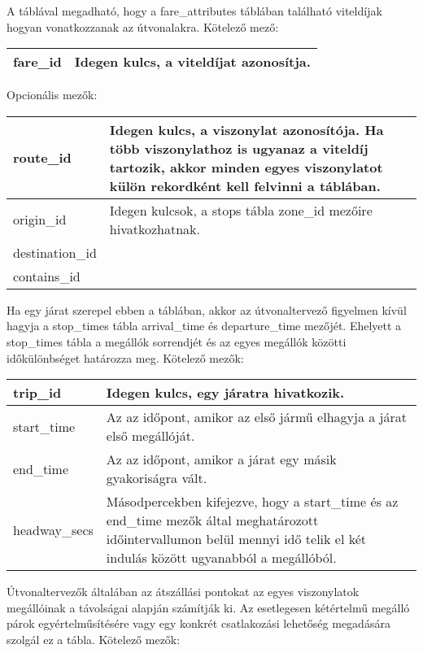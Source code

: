 
A táblával megadható, hogy a fare\_attributes táblában található viteldíjak hogyan vonatkozzanak az útvonalakra.
Kötelező mező:

\begin{tabular}{|p{3cm}|p{10cm}|}
\hline
fare\_id & Idegen kulcs, a viteldíjat azonosítja. \\
\hline
\end{tabular}

Opcionális mezők:


\begin{tabular}{|p{3cm}|p{10cm}|}
\hline
route\_id & Idegen kulcs, a viszonylat azonosítója. Ha több viszonylathoz is ugyanaz a viteldíj tartozik, akkor minden egyes viszonylatot külön rekordként kell felvinni a táblában. \\
\hline
origin\_id & Idegen kulcsok, a stops tábla zone\_id mezőire hivatkozhatnak. \\
\hline
destination\_id &  \\
\hline
contains\_id & \\
\hline
\end{tabular}


Ha egy járat szerepel ebben a táblában, akkor az útvonaltervező figyelmen kívül hagyja a stop\_times tábla arrival\_time és departure\_time mezőjét. Ehelyett a stop\_times tábla a megállók sorrendjét és az egyes megállók közötti időkülönbséget határozza meg.
Kötelező mezők:

\begin{tabular}{|p{3cm}|p{10cm}|}
\hline
trip\_id & Idegen kulcs, egy járatra hivatkozik. \\
\hline
start\_time & Az az időpont, amikor az első jármű elhagyja a járat első megállóját. \\
\hline
end\_time & Az az időpont, amikor a járat egy másik gyakoriságra vált. \\
\hline
headway\_secs & Másodpercekben kifejezve, hogy a start\_time és az end\_time mezők által meghatározott időintervallumon belül mennyi idő telik el két indulás között ugyanabból a megállóból. \\
\hline
\end{tabular}


Útvonaltervezők általában az átszállási pontokat az egyes viszonylatok megállóinak a távolságai alapján számítják ki. Az esetlegesen kétértelmű megálló párok egyértelműsítésére vagy egy konkrét csatlakozási lehetőség megadására szolgál ez a tábla.
Kötelező mezők:

